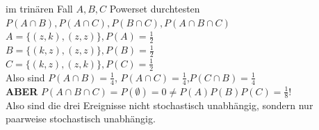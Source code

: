 \documentclass{article}
\begin{document}
	im trinären Fall $A,B,C$ Powerset durchtesten $P(A\cap B), P(A\cap C), P(B\cap C), P(A\cap B\cap C)$\\
	$A=\{(z,k),(z,z)\}, P(A)=\frac{1}{2}$\\
	$B=\{(k,z),(z,z)\}, P(B)=\frac{1}{2}$\\
	$C=\{(k,z),(z,k)\}, P(C)=\frac{1}{2}$\\
	Also sind $P(A\cap B)=\frac{1}{4}$, $P(A\cap C)=\frac{1}{4}$,$P(C\cap B)=\frac{1}{4}$\\
	\textbf{ABER} $P(A\cap B\cap C) = P(\emptyset) =0\neq P(A)P(B)P(C) = \frac{1}{8}$!\\
	Also sind die drei Ereignisse nicht stochastisch unabhängig, sondern nur paarweise stochastisch unabhängig.\\
\end{document}
